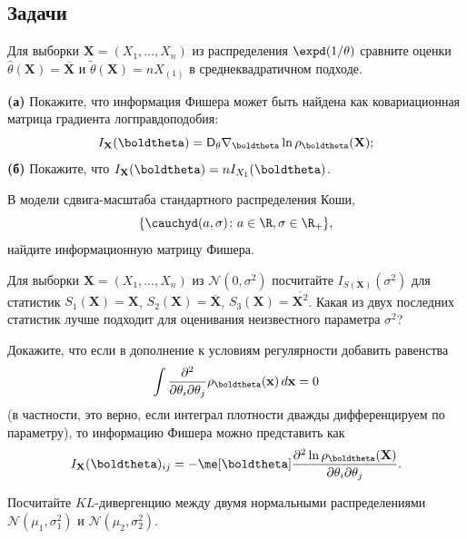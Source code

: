 \subsection*{Задачи}

\begin{problem}
	Для выборки $\mathbf X = (X_1, \ldots, X_n)$ из распределения $\expd(1/\theta)$ сравните оценки $\widehat{\theta}(\mathbf X) = \overline{\mathbf X}$ и $\widetilde{\theta}(\mathbf X) = nX_{(1)}$ в среднеквадратичном подходе.
\end{problem}

\begin{problem}
	\textbf{(а)} Покажите, что информация Фишера может быть найдена как ковариационная матрица градиента логправдоподобия:
	\[
	I_{\mathbf X}(\boldtheta) = \mathsf{D}_{\theta} \nabla_{\boldtheta} \ln{\rho_{\boldtheta}(\mathbf{X})};
	\]
	\textbf{(б)} Покажите, что $I_{\mathbf X}(\boldtheta) = nI_{X_1}(\boldtheta)$.
\end{problem}

\begin{problem}
	В модели сдвига-масштаба стандартного распределения Коши,
	\[
	\{\cauchyd(a, \sigma)\colon a \in \R, \sigma \in \R_+\},
	\]
	найдите информационную матрицу Фишера.
\end{problem}

\begin{problem}
	Для выборки $\mathbf X = (X_1, \ldots, X_n)$ из $\mathcal{N}(0, \sigma^2)$ посчитайте $I_{S(\mathbf X)}(\sigma^2)$ для статистик $S_1(\mathbf X) = \mathbf X$, $S_2(\mathbf X) = \overline{\mathbf X}$, $S_3(\mathbf X) = \overline{\mathbf X^2}$. Какая из двух последних статистик лучше подходит для оценивания неизвестного параметра $\sigma^2$?
\end{problem}

\begin{problem}\label{fisher-inf-is-second-derivative}
	Докажите, что если в дополнение к условиям регулярности добавить равенства
	\[
	\int \frac{\partial^2}{\partial \theta_i \partial \theta_j}\rho_{\boldtheta}(\mathbf{x})\,d\mathbf{x} = 0
	\]
	(в частности, это верно, если интеграл плотности дважды дифференцируем по параметру), то информацию Фишера можно представить как
	\[
	I_{\mathbf X}(\boldtheta)_{ij} = - \me[\boldtheta] \frac{\partial^2 \ln{\rho_{\boldtheta}(\mathbf X)}}{\partial \theta_i \partial \theta_j}.
	\]
\end{problem}

\begin{problem}\label{kl_normal}
	Посчитайте $KL$-дивергенцию между двумя нормальными распределениями $\mathcal{N}(\mu_1, \sigma_1^2)$ и $\mathcal{N}(\mu_2, \sigma_2^2)$.
\end{problem}




